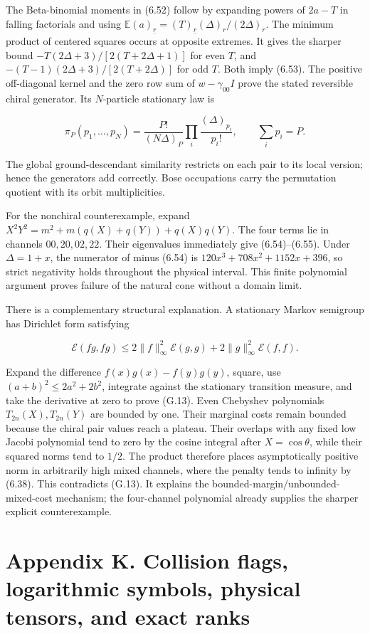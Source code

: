 \documentclass[a4paper,11pt]{article}
\numberwithin{equation}{section}
\begin{document}
The Beta-binomial moments in (6.52) follow by expanding powers of \(2a-T\) in falling factorials and using \(\mathbb E(a)_{\underline r}=(T)_{\underline r}(\Delta)_r/(2\Delta)_r\). The minimum product of centered squares occurs at opposite extremes. It gives the sharper bound \(-T(2\Delta+3)/[2(T+2\Delta+1)]\) for even \(T\), and \(-(T-1)(2\Delta+3)/[2(T+2\Delta)]\) for odd \(T\). Both imply (6.53). The positive off-diagonal kernel and the zero row sum of \(w-\gamma_{00}I\) prove the stated reversible chiral generator. Its \(N\)-particle stationary law is

\[
\pi_P(p_1,\ldots,p_N)=\frac{P!}{(N\Delta)_P}
\prod_i\frac{(\Delta)_{p_i}}{p_i!},\qquad \sum_ip_i=P.
\tag{G.12}
\]

The global ground-descendant similarity restricts on each pair to its local version; hence the generators add correctly. Bose occupations carry the permutation quotient with its orbit multiplicities.

For the nonchiral counterexample, expand \(X^2Y^2=m^2+m(q(X)+q(Y))+q(X)q(Y)\). The four terms lie in channels \(00,20,02,22\). Their eigenvalues immediately give (6.54)--(6.55). Under \(\Delta=1+x\), the numerator of minus (6.54) is \(120x^3+708x^2+1152x+396\), so strict negativity holds throughout the physical interval. This finite polynomial argument proves failure of the natural cone without a domain limit.

There is a complementary structural explanation. A stationary Markov semigroup has Dirichlet form satisfying

\[
\mathcal E(fg,fg)\le2\|f\|_\infty^2\mathcal E(g,g)
+2\|g\|_\infty^2\mathcal E(f,f).
\tag{G.13}
\]

Expand the difference \(f(x)g(x)-f(y)g(y)\), square, use \((a+b)^2\le2a^2+2b^2\), integrate against the stationary transition measure, and take the derivative at zero to prove (G.13). Even Chebyshev polynomials \(T_{2n}(X),T_{2n}(Y)\) are bounded by one. Their marginal costs remain bounded because the chiral pair values reach a plateau. Their overlaps with any fixed low Jacobi polynomial tend to zero by the cosine integral after \(X=\cos\theta\), while their squared norms tend to \(1/2\). The product therefore places asymptotically positive norm in arbitrarily high mixed channels, where the penalty tends to infinity by (6.38). This contradicts (G.13). It explains the bounded-margin/unbounded-mixed-cost mechanism; the four-channel polynomial already supplies the sharper explicit counterexample.

\clearpage
\hypertarget{appendix-k.-collision-flags-logarithmic-symbols-physical-tensors-and-exact-ranks}{%
\section{Appendix K. Collision flags, logarithmic symbols, physical tensors, and exact ranks}\label{appendix-k.-collision-flags-logarithmic-symbols-physical-tensors-and-exact-ranks}}
\end{document}
